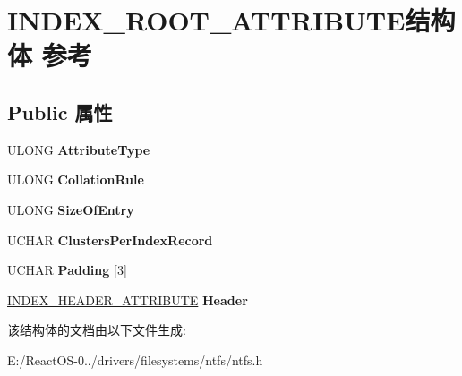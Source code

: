 \hypertarget{struct_i_n_d_e_x___r_o_o_t___a_t_t_r_i_b_u_t_e}{}\section{I\+N\+D\+E\+X\+\_\+\+R\+O\+O\+T\+\_\+\+A\+T\+T\+R\+I\+B\+U\+T\+E结构体 参考}
\label{struct_i_n_d_e_x___r_o_o_t___a_t_t_r_i_b_u_t_e}
\subsection*{Public 属性}
\begin{DoxyCompactItemize}
\item 
\mbox{\label{struct_i_n_d_e_x___r_o_o_t___a_t_t_r_i_b_u_t_e_a778d8dd6da91fc7162e4f9c52fe50764}} 
U\+L\+O\+NG {\bfseries Attribute\+Type}
\item 
\mbox{\label{struct_i_n_d_e_x___r_o_o_t___a_t_t_r_i_b_u_t_e_a84fd0276af57e57c8637befd09069f91}} 
U\+L\+O\+NG {\bfseries Collation\+Rule}
\item 
\mbox{\label{struct_i_n_d_e_x___r_o_o_t___a_t_t_r_i_b_u_t_e_af0fc8b0418c5eb3ac438af3675e62277}} 
U\+L\+O\+NG {\bfseries Size\+Of\+Entry}
\item 
\mbox{\label{struct_i_n_d_e_x___r_o_o_t___a_t_t_r_i_b_u_t_e_ad8665d1c6a447f45042d81d967fe795c}} 
U\+C\+H\+AR {\bfseries Clusters\+Per\+Index\+Record}
\item 
\mbox{\label{struct_i_n_d_e_x___r_o_o_t___a_t_t_r_i_b_u_t_e_a44b47b68eef0955f866af6e97b361b2a}} 
U\+C\+H\+AR {\bfseries Padding} \mbox{[}3\mbox{]}
\item 
\mbox{\label{struct_i_n_d_e_x___r_o_o_t___a_t_t_r_i_b_u_t_e_ab01b14adc76809b3cc6fa9229831dc7f}} 
\hyperlink{struct_i_n_d_e_x___h_e_a_d_e_r___a_t_t_r_i_b_u_t_e}{I\+N\+D\+E\+X\+\_\+\+H\+E\+A\+D\+E\+R\+\_\+\+A\+T\+T\+R\+I\+B\+U\+TE} {\bfseries Header}
\end{DoxyCompactItemize}


该结构体的文档由以下文件生成\+:\begin{DoxyCompactItemize}
\item 
E\+:/\+React\+O\+S-\/0../drivers/filesystems/ntfs/ntfs.\+h\end{DoxyCompactItemize}
